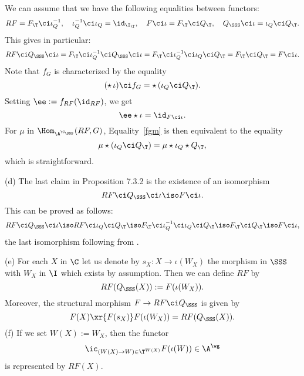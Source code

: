 \documentclass[12pt]{article}
\theoremstyle{remark}
\theoremstyle{definition}
\begin{document}
\begin{s}
We can assume that we have the following equalities between functors: 
$$
RF=F_\T\ci\iota_Q^{-1},\quad\iota_Q^{-1}\ci\iota_Q=\id_{\I_\T},\quad F\ci\iota=F_\T\ci Q_\T,\quad Q_\SSS\ci\iota=\iota_Q\ci Q_\T. 
$$ 
This gives in particular:
$$
RF\ci Q_\SSS\ci\iota=F_\T\ci\iota_Q^{-1}\ci Q_\SSS\ci\iota=F_\T\ci\iota_Q^{-1}\ci \iota_Q\ci Q_\T=F_\T\ci Q_\T=F\ci\iota.
$$ 
Note that $f_G$ is characterized by the equality 
$$
(\star\,\iota)\ci f_G=\star\,(\iota_Q\ci Q_\T).
$$ 
Setting $\ee:=f_{RF}(\id_{RF})$, we get 
$$
\ee\star\iota=\id_{F\ci\iota}.
$$ 
For $\mu$ in $\Hom_{\A^{\C_\SSS}}(RF,G)$, Equality~\eqref{fgm} is then equivalent to the equality 
$$
\mu\star(\iota_Q\ci Q_\T)=\mu\star\iota_Q\star Q_\T,
$$ 
which is straightforward. %

\nn(d) The last claim in Proposition 7.3.2 is the existence of an isomorphism 
$$
RF\ci Q_\SSS\ci\iota\iso F\ci\iota.
$$ 
This can be proved as follows: 
$$
RF\ci Q_\SSS\ci\iota\iso RF\ci\iota_Q\ci Q_\T\iso F_\T\ci\iota_Q^{-1}\ci\iota_Q\ci Q_\T\iso F_\T\ci Q_\T\iso F\ci\iota,
$$ 
the last isomorphism following from .

\nn(e) For each $X$ in $\C$ let us denote by $s_X:X\to\iota(W_X)$ the morphism in $\SSS$ with $W_X$ in $\I$ which exists by assumption. Then we can define $RF$ by 
$$
RF(Q_\SSS(X)):=F(\iota(W_X)).
$$ 
Moreover, the structural morphism $F\to RF\ci Q_\SSS$ is given by 
$$
F(X)\xr{F(s_X)}F(\iota(W_X))=RF(Q_\SSS(X)).
$$ 
(f) If we set $W(X):=W_X$, then the functor 
$$
\ic_{(W(X)\to W)\in\T^{W(X)}}F(\iota(W))\in\A^\wg
$$ 
is represented by $RF(X)$.


\end{s}
\end{document}
